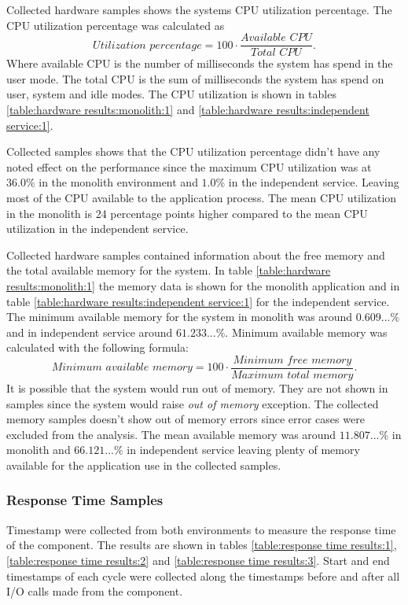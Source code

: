 Collected hardware samples shows the systems CPU utilization percentage.
The CPU utilization percentage was calculated as
\[
\textit{Utilization percentage} = 100 \cdot \frac{\textit{Available CPU}}{\textit{Total CPU}}
.\]
Where available CPU is the number of milliseconds the system has spend in the user mode.
The total CPU is the sum of milliseconds the system has spend on user, system and idle modes. The CPU utilization is shown in tables \ref{table:hardware results:monolith:1} and \ref{table:hardware results:independent service:1}.

Collected samples shows that the CPU utilization percentage didn't have any noted effect on the performance since the maximum CPU utilization was at $36.0\%$ in the monolith environment and $1.0\%$ in the independent service.
Leaving most of the CPU available to the application process.
The mean CPU utilization in the monolith is 24 percentage points higher compared to the mean CPU utilization in the independent service.

Collected hardware samples contained information about the free memory and the total available memory for the system.
In table \ref{table:hardware results:monolith:1} the memory data is shown for the monolith application and in table \ref{table:hardware results:independent service:1} for the independent service.
The minimum available memory for the system in monolith was around $0.609...\%$ and in independent service around $61.233...\%$.
Minimum available memory was calculated with the following formula:
\[
\textit{Minimum available memory} = 100 \cdot \frac{\textit{Minimum free memory}}{\textit{Maximum total memory}}
.\]
It is possible that the system would run out of memory.
They are not shown in samples since the system would raise \textit{out of memory} exception.
The collected memory samples doesn't show out of memory errors since error cases were excluded from the analysis.
The mean available memory was around $11.807...\%$ in monolith and $66.121...\%$ in independent service leaving plenty of memory available for the application use in the collected samples.

\subsubsection{Response Time Samples}
Timestamp were collected from both environments to measure the response time of the component.
The results are shown in tables \ref{table:response time results:1}, \ref{table:response time results:2} and \ref{table:response time results:3}.
Start and end timestamps of each cycle were collected along the timestamps before and after all I/O calls made from the component.

